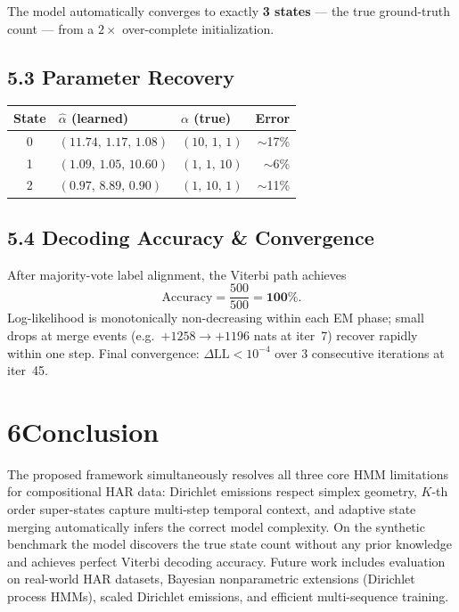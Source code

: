 \documentclass[10pt,a4paper,twocolumn]{article}
\begin{document}
The model automatically converges to exactly \textbf{3 states} — the true
ground-truth count — from a $2\times$ over-complete initialization.

\subsection*{5.3\; Parameter Recovery}

\begin{center}
\footnotesize
\renewcommand{\arraystretch}{1.1}
\begin{tabular}{@{}cllr@{}}
\toprule
\textbf{State} & $\hat{\alpha}$ (learned) & $\alpha$ (true) & \textbf{Error} \\
\midrule
0 & $(11.74,\,1.17,\,1.08)$ & $(10,\,1,\,1)$ & $\sim$17\% \\
1 & $(1.09,\,1.05,\,10.60)$ & $(1,\,1,\,10)$ & $\sim$6\%  \\
2 & $(0.97,\,8.89,\,0.90)$  & $(1,\,10,\,1)$ & $\sim$11\% \\
\bottomrule
\end{tabular}
\end{center}

\subsection*{5.4\; Decoding Accuracy \& Convergence}

After majority-vote label alignment, the Viterbi path achieves
\[
  \text{Accuracy} = \frac{500}{500} = \mathbf{100\%}.
\]
Log-likelihood is monotonically non-decreasing within each EM phase;
small drops at merge events (e.g.\ $+1258 \to +1196$ nats at iter~7)
recover rapidly within one step.  Final convergence: $\Delta\text{LL} < 10^{-4}$
over 3 consecutive iterations at iter~45.

\section*{6\quad Conclusion}

The proposed framework simultaneously resolves all three core HMM limitations
for compositional HAR data: Dirichlet emissions respect simplex geometry,
$K$-th order super-states capture multi-step temporal context, and adaptive
state merging automatically infers the correct model complexity.
On the synthetic benchmark the model discovers the true state count without any
prior knowledge and achieves perfect Viterbi decoding accuracy.
Future work includes evaluation on real-world HAR datasets, Bayesian
nonparametric extensions (Dirichlet process HMMs), scaled Dirichlet
emissions, and efficient multi-sequence training.
\end{document}
